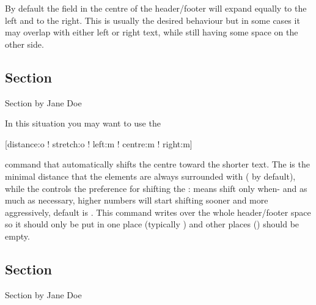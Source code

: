 By default the field in the centre of the header\slash{}footer will expand equally
to the left and to the right. This is usually the desired behaviour but in some
cases it may overlap with either left or right text, while still having some
space on the other side.
\begin{example}[standalone, paperheight=3cm]
\geometry{includehead, includefoot, headsep=.5em, footskip=1em} %
\sloppy %
\usepackage{fancyhdr}%
\usepackage{extramarks}%
\pagestyle{fancy}%
\fancyhead[L]{\thepage}
\fancyhead[C]{\firstleftmark}

\section{Section}
Section by Jane Doe
\end{example}
In this situation you may want to use the
\begin{lscommand}
  [distance:o ! stretch:o ! left:m ! centre:m ! right:m]
\end{lscommand}
command that automatically shifts the centre toward the shorter text. The
 is the minimal distance that the elements are always surrounded
with (\cargv{1em} by default), while the  controls the preference
for shifting the :  means shift only when- and as much
as necessary, higher numbers will start shifting sooner and more aggressively,
default is . This command writes over the whole header\slash{}footer
space so it should only be put in one place (typically ) and other
places () should be empty.
\begin{example}[standalone, paperheight=3cm]
\geometry{includehead, includefoot, headsep=.5em, footskip=1em} %
\sloppy %
\usepackage{fancyhdr}%
\usepackage{extramarks}%
\pagestyle{fancy}%
\fancyhead[L,R]{}

\section{Section}
Section by Jane Doe
\end{example}

